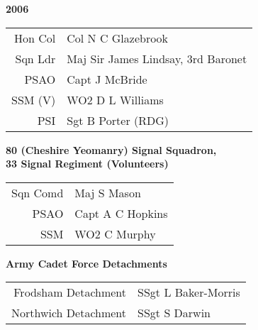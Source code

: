 \begin{center}
  \Huge
  \textbf{2006}
\end{center}

\begin{center}
  \small
  \begin{tabular}{rl}
    Hon Col & Col N C Glazebrook \\
    Sqn Ldr & Maj Sir James Lindsay, 3rd Baronet \\
    PSAO & Capt J McBride \\
    SSM (V) & WO2 D L Williams \\
    PSI & Sgt B Porter (RDG) \\
  \end{tabular}
\end{center}

\begin{center}
  \Large
  \textbf{80 (Cheshire Yeomanry) Signal Squadron, \\ 33 Signal Regiment (Volunteers)}
\end{center}

\begin{center}
  \small
  \begin{tabular}{rl}
    Sqn Comd & Maj S Mason \\
    PSAO & Capt A C Hopkins \\
    SSM & WO2 C Murphy \\
  \end{tabular}
\end{center}

\begin{center}
  \Large
  \textbf{Army Cadet Force Detachments}
\end{center}

\begin{center}
  \small
  \begin{tabular}{rl}
    Frodsham Detachment & SSgt L Baker-Morris \\
    Northwich Detachment & SSgt S Darwin \\
  \end{tabular}
\end{center}

\vspace{50mm}

\pagebreak
